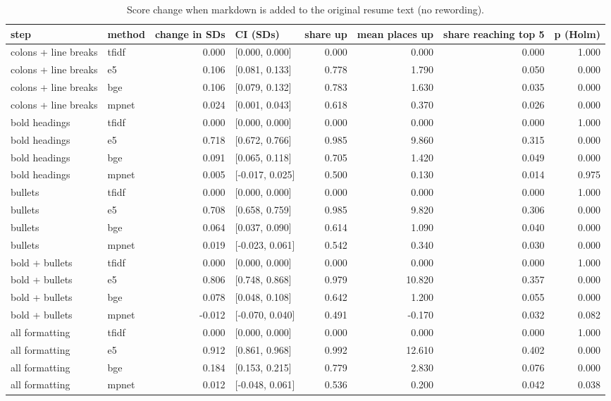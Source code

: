 \begin{table}
\caption{Score change when markdown is added to the original resume text (no rewording).}
\label{tab:t8c_markdown_injection}
\begin{tabular}{llrlrrrr}
\toprule
step & method & change in SDs & CI (SDs) & share up & mean places up & share reaching top 5 & p (Holm) \\
\midrule
colons + line breaks & tfidf & 0.000 & [0.000, 0.000] & 0.000 & 0.000 & 0.000 & 1.000 \\
colons + line breaks & e5 & 0.106 & [0.081, 0.133] & 0.778 & 1.790 & 0.050 & 0.000 \\
colons + line breaks & bge & 0.106 & [0.079, 0.132] & 0.783 & 1.630 & 0.035 & 0.000 \\
colons + line breaks & mpnet & 0.024 & [0.001, 0.043] & 0.618 & 0.370 & 0.026 & 0.000 \\
bold headings & tfidf & 0.000 & [0.000, 0.000] & 0.000 & 0.000 & 0.000 & 1.000 \\
bold headings & e5 & 0.718 & [0.672, 0.766] & 0.985 & 9.860 & 0.315 & 0.000 \\
bold headings & bge & 0.091 & [0.065, 0.118] & 0.705 & 1.420 & 0.049 & 0.000 \\
bold headings & mpnet & 0.005 & [-0.017, 0.025] & 0.500 & 0.130 & 0.014 & 0.975 \\
bullets & tfidf & 0.000 & [0.000, 0.000] & 0.000 & 0.000 & 0.000 & 1.000 \\
bullets & e5 & 0.708 & [0.658, 0.759] & 0.985 & 9.820 & 0.306 & 0.000 \\
bullets & bge & 0.064 & [0.037, 0.090] & 0.614 & 1.090 & 0.040 & 0.000 \\
bullets & mpnet & 0.019 & [-0.023, 0.061] & 0.542 & 0.340 & 0.030 & 0.000 \\
bold + bullets & tfidf & 0.000 & [0.000, 0.000] & 0.000 & 0.000 & 0.000 & 1.000 \\
bold + bullets & e5 & 0.806 & [0.748, 0.868] & 0.979 & 10.820 & 0.357 & 0.000 \\
bold + bullets & bge & 0.078 & [0.048, 0.108] & 0.642 & 1.200 & 0.055 & 0.000 \\
bold + bullets & mpnet & -0.012 & [-0.070, 0.040] & 0.491 & -0.170 & 0.032 & 0.082 \\
all formatting & tfidf & 0.000 & [0.000, 0.000] & 0.000 & 0.000 & 0.000 & 1.000 \\
all formatting & e5 & 0.912 & [0.861, 0.968] & 0.992 & 12.610 & 0.402 & 0.000 \\
all formatting & bge & 0.184 & [0.153, 0.215] & 0.779 & 2.830 & 0.076 & 0.000 \\
all formatting & mpnet & 0.012 & [-0.048, 0.061] & 0.536 & 0.200 & 0.042 & 0.038 \\
\bottomrule
\end{tabular}
\end{table}
